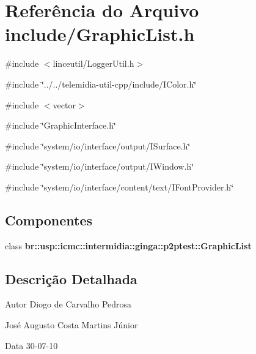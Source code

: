 \section{Referência do Arquivo include/GraphicList.h}
\label{GraphicList_8h}
{\ttfamily \#include $<$linceutil/LoggerUtil.h$>$}\par
{\ttfamily \#include \char`\"{}../../telemidia-\/util-\/cpp/include/IColor.h\char`\"{}}\par
{\ttfamily \#include $<$vector$>$}\par
{\ttfamily \#include \char`\"{}GraphicInterface.h\char`\"{}}\par
{\ttfamily \#include \char`\"{}system/io/interface/output/ISurface.h\char`\"{}}\par
{\ttfamily \#include \char`\"{}system/io/interface/output/IWindow.h\char`\"{}}\par
{\ttfamily \#include \char`\"{}system/io/interface/content/text/IFontProvider.h\char`\"{}}\par
\subsection*{Componentes}
\begin{DoxyCompactItemize}
\item 
class {\bf br::usp::icmc::intermidia::ginga::p2ptest::GraphicList}
\end{DoxyCompactItemize}


\subsection{Descrição Detalhada}
\begin{DoxyAuthor}{Autor}
Diogo de Carvalho Pedrosa 

José Augusto Costa Martins Júnior 
\end{DoxyAuthor}
\begin{DoxyDate}{Data}
30-\/07-\/10 
\end{DoxyDate}
